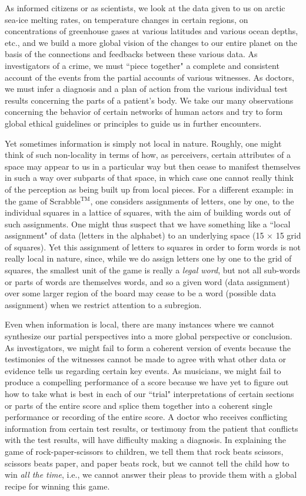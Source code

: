 \documentclass[a4paper]{book}
\theoremstyle{definition}
\theoremstyle{definition}
\theoremstyle{definition}
\theoremstyle{theorem}
\theoremstyle{definition}
\begin{document}
	As informed citizens or as scientists, we look at the data given to us on arctic sea-ice melting rates, on temperature changes in certain regions, on concentrations of greenhouse gases at various latitudes and various ocean depths, etc., and we build a more global vision of the changes to our entire planet on the basis of the connections and feedbacks between these various data. As investigators of a crime, we must ``piece together" a complete and consistent account of the events from the partial accounts of various witnesses. As doctors, we must infer a diagnosis and a plan of action from the various individual test results concerning the parts of a patient's body. We take our many observations concerning the behavior of certain networks of human actors and try to form global ethical guidelines or principles to guide us in further encounters. \par 
	Yet sometimes information is simply not local in nature. Roughly, one might think of such non-locality in terms of how, as perceivers, certain attributes of a space may appear to us in a particular way but then cease to manifest themselves in such a way over subparts of that space, in which case one cannot really think of the perception as being built up from local pieces. For a different example: in the game of Scrabble$^{\text{TM}}$, one considers assignments of letters, one by one, to the individual squares in a lattice of squares, with the aim of building words out of such assignments. One might thus suspect that we have something like a ``local assignment" of data (letters in the alphabet) to an underlying space (15 $\times$ 15 grid of squares). Yet this assignment of letters to squares in order to form words is not really local in nature, since, while we do assign letters one by one to the grid of squares, the smallest unit of the game is really a \textit{legal word}, but not all sub-words or parts of words are themselves words, and so a given word (data assignment) over some larger region of the board may cease to be a word (possible data assignment) when we restrict attention to a subregion. \par  
	Even when information is local, there are many instances where we cannot synthesize our partial perspectives into a more global perspective or conclusion. As investigators, we might fail to form a coherent version of events because the testimonies of the witnesses cannot be made to agree with what other data or evidence tells us regarding certain key events. As musicians, we might fail to produce a compelling performance of a score because we have yet to figure out how to take what is best in each of our ``trial" interpretations of certain sections or parts of the entire score and splice them together into a coherent single performance or recording of the entire score. A doctor who receives conflicting information from certain test results, or testimony from the patient that conflicts with the test results, will have difficulty making a diagnosis. In explaining the game of rock-paper-scissors to children, we tell them that rock beats scissors, scissors beats paper, and paper beats rock, but we cannot tell the child how to win \textit{all the time}, i.e., we cannot answer their pleas to provide them with a global recipe for winning this game.\par 
\end{document}
